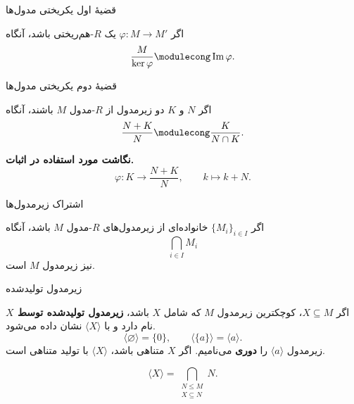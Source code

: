 \begin{frame}{قضیهٔ اول یکریختی مدول‌ها}
    \label{lec04:first-isomorphism}
    \begin{theorem}
        اگر $\varphi:M\to M'$ یک $R$-هم‌ریختی باشد، آنگاه
        \[
            \frac{M}{\ker\varphi}\modulecong\operatorname{Im}\varphi.
        \]
    \end{theorem}
\end{frame}

\begin{frame}{قضیهٔ دوم یکریختی مدول‌ها}
    \label{lec04:second-isomorphism}
    \begin{theorem}
        اگر $N$ و $K$ دو زیرمدول از $R$-مدول $M$ باشند، آنگاه
        \[
            \frac{N+K}{N}\modulecong\frac{K}{N\cap K}.
        \]
    \end{theorem}
    \textbf{نگاشت مورد استفاده در اثبات.}
    \[
        \varphi:K\longrightarrow\frac{N+K}{N},
        \qquad k\longmapsto k+N.
    \]
\end{frame}

\begin{frame}{اشتراک زیرمدول‌ها}
    \label{lec04:intersection-submodules}
    \begin{lemma}
        اگر $\{M_i\}_{i\in I}$ خانواده‌ای از زیرمدول‌های $R$-مدول $M$ باشد،
        آنگاه
        \[
            \bigcap_{i\in I}M_i
        \]
        نیز زیرمدول $M$ است.
    \end{lemma}
\end{frame}

\begin{frame}{زیرمدول تولیدشده}
    \label{lec04:generated-submodule}
    \begin{definition}
        اگر $X\subseteq M$، کوچکترین زیرمدول $M$ که شامل $X$ باشد،
        \textbf{زیرمدول تولیدشده توسط $X$} نام دارد و با
        $\langle X\rangle$ نشان داده می‌شود.
        \[
            \langle\varnothing\rangle=\{0\},\qquad
            \langle\{a\}\rangle=\langle a\rangle.
        \]
        زیرمدول $\langle a\rangle$ را \textbf{دوری} می‌نامیم.
        اگر $X$ متناهی باشد، $\langle X\rangle$ با تولید متناهی است.
    \end{definition}
    \begin{lemma}
        \[
            \langle X\rangle=
            \bigcap_{\substack{N\leq M\\X\subseteq N}}N.
        \]
    \end{lemma}
\end{frame}

